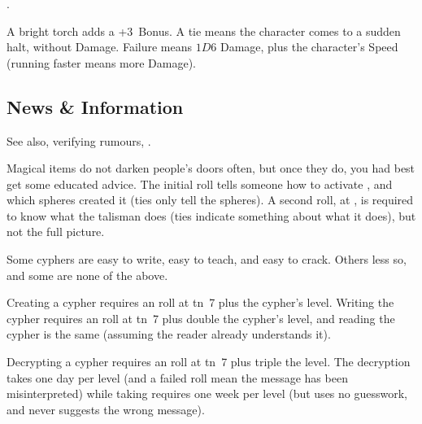 \begin{multicols}{2}
\subsubsection{}
.

%
A bright \gls{torch} adds a +3~Bonus.
A tie means the character comes to a sudden halt, without Damage.
Failure means $1D6$ Damage, plus the character's Speed (running faster means more Damage).

\subsection{News \& Information}

See also, verifying rumours, .

Magical items do not darken people's doors often, but once they do, you had best get some educated advice.
The initial roll tells someone how to activate , and which \glspl{sphere} created it (ties only tell the \glspl{sphere}).
A second roll, at \tn[14], is required to know what the \gls{talisman} does (ties indicate something about what it does), but not the full picture.


Some cyphers are easy to write, easy to teach, and easy to crack.
Others less so, and some are none of the above.

Creating a cypher requires an  roll at \gls{tn}~7 plus the cypher's level.
Writing the cypher requires an  roll at \gls{tn}~7 plus double the cypher's level, and reading the cypher is the same (assuming the reader already understands it).

Decrypting a cypher requires an  roll at \gls{tn}~7 plus triple the level.
The decryption takes one day per level (and a failed roll mean the message has been misinterpreted) while taking  requires one week per level (but uses no guesswork, and never suggests the wrong message).


\end{multicols}
